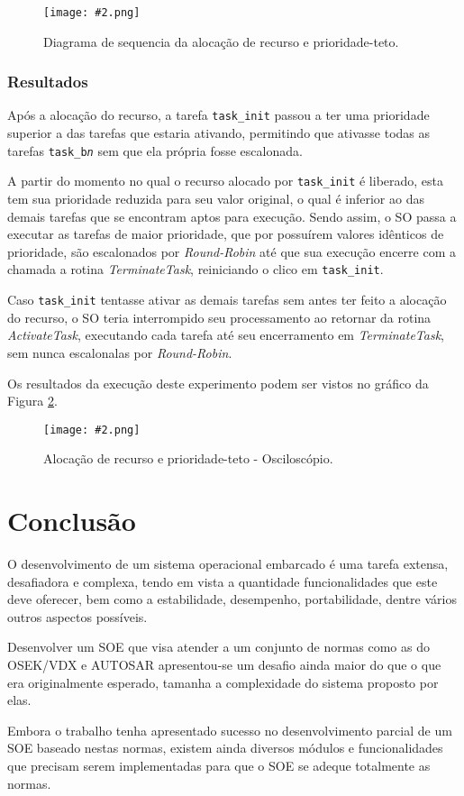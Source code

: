 \documentclass[conference,compsoc]{IEEEtran}
\newcommand{\reffig}[1]{Figura \ref{fig:#1}}
\newcommand{\figura}[5][Extraido de:]{
	\begin{figure}[h!tb]
		\centering
		\caption{#3.}
		\texttt{[image: \#2.png]}
		\ifthenelse{\isempty{#5}}{}{%
			\\ #1 \cite{#5}.
		}	
		\label{fig:#2}
	\end{figure}
}
\begin{document}
\figura{cap5_scheduler_res}{Diagrama de sequencia da alocação de recurso e prioridade-teto}{6cm}{}

\subsubsection{Resultados}

Após a alocação do recurso, a tarefa \texttt{task\_init} passou a ter uma prioridade superior a das tarefas que estaria ativando, permitindo que ativasse todas as tarefas \texttt{task\_b\textit{n}} sem que ela própria fosse escalonada.

A partir do momento no qual o recurso alocado por \texttt{task\_init} é liberado, esta tem sua prioridade reduzida para seu valor original, o qual é inferior ao das demais tarefas que se encontram aptos para execução. Sendo assim, o SO passa a executar as tarefas de maior prioridade, que por possuírem valores idênticos de prioridade, são escalonados por \emph{Round-Robin} até que sua execução encerre com a chamada a rotina \emph{TerminateTask}, reiniciando o clico em \texttt{task\_init}.

Caso \texttt{task\_init} tentasse ativar as demais tarefas sem antes ter feito a alocação do recurso, o SO teria interrompido seu processamento ao retornar da rotina \emph{ActivateTask}, executando cada tarefa até seu encerramento em \emph{TerminateTask}, sem nunca escalonalas por \emph{Round-Robin}.

Os resultados da execução deste experimento podem ser vistos no gráfico da \reffig{cap5_scheduler_res_osc}.

\figura{cap5_scheduler_res_osc}{Alocação de recurso e prioridade-teto - Osciloscópio}{6cm}{}

\section{Conclusão}

O desenvolvimento de um sistema operacional embarcado é uma tarefa extensa, desafiadora e complexa, tendo em vista a quantidade funcionalidades que este deve oferecer, bem como a estabilidade, desempenho, portabilidade, dentre vários outros aspectos possíveis.

Desenvolver um SOE que visa atender a um conjunto de normas como as do OSEK/VDX e AUTOSAR apresentou-se um desafio ainda maior do que o que era originalmente esperado, tamanha a complexidade do sistema proposto por elas.

Embora o trabalho tenha apresentado sucesso no desenvolvimento parcial de um SOE baseado nestas normas, existem ainda diversos módulos e funcionalidades que precisam serem implementadas para que o SOE se adeque totalmente as normas.
\end{document}
